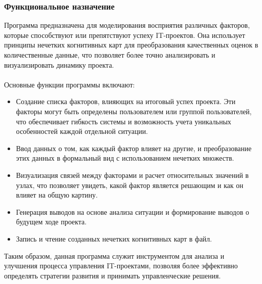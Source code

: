 \documentclass{article}
\begin{document}
    \subsubsection {Функциональное назначение}
    Программа предназначена для моделирования восприятия различных факторов, которые способствуют или препятствуют успеху IT-проектов. Она использует принципы нечетких когнитивных карт для преобразования качественных оценок в количественные данные, что позволяет более точно анализировать и визуализировать динамику проекта.\\
    ~\\
    Основные функции программы включают:
    \begin{itemize}
        \item Создание списка факторов, влияющих на итоговый успех проекта. Эти факторы могут быть определены пользователем или группой пользователей, что обеспечивает гибкость системы и возможность учета уникальных особенностей каждой отдельной ситуации.
        \item Ввод данных о том, как каждый фактор влияет на другие, и преобразование этих данных в формальный вид с использованием нечетких множеств.
        \item Визуализация связей между факторами и расчет относительных значений в узлах, что позволяет увидеть, какой фактор является решающим и как он влияет на общую картину.
        \item Генерация выводов на основе анализа ситуации и формирование выводов о будущем ходе проекта.
        \item Запись и чтение созданных нечетких когнитивных карт в файл.
    \end{itemize}
    Таким образом, данная программа служит инструментом для анализа и улучшения процесса управления IT-проектами, позволяя более эффективно определять стратегии развития и принимать управленческие решения.
\end{document}
